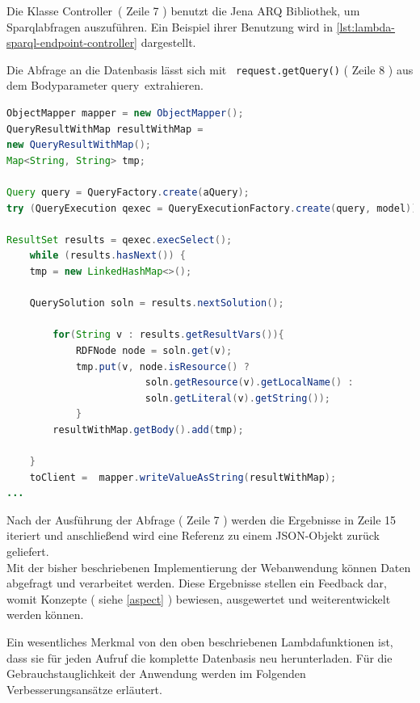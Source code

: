 \documentclass[
12pt,
english,
ngerman,
headsepline,
twoside,
openright,
numbers=noenddot,version=first
]{scrreprt}
\begin{document}
Die Klasse \glqq Controller\grqq\ ( Zeile 7 ) benutzt die Jena ARQ Bibliothek, um Sparqlabfragen auszuführen. Ein Beispiel ihrer Benutzung wird in \autoref{lst:lambda-sparql-endpoint-controller} dargestellt. 

Die Abfrage an die Datenbasis lässt sich mit \lstinline| request.getQuery()| ( Zeile 8 ) aus dem Bodyparameter \glqq query\grqq\ extrahieren.

\begin{lstlisting}[language=Java,caption={Lambda Sparql-Endpoint-Controller},label={lst:lambda-sparql-endpoint-controller}]
ObjectMapper mapper = new ObjectMapper();
QueryResultWithMap resultWithMap =
new QueryResultWithMap();
Map<String, String> tmp;

Query query = QueryFactory.create(aQuery);
try (QueryExecution qexec = QueryExecutionFactory.create(query, model)) {

ResultSet results = qexec.execSelect();
	while (results.hasNext()) {
	tmp = new LinkedHashMap<>();

	QuerySolution soln = results.nextSolution();

		for(String v : results.getResultVars()){
			RDFNode node = soln.get(v);
			tmp.put(v, node.isResource() ?
						soln.getResource(v).getLocalName() :
						soln.getLiteral(v).getString());
			}
		resultWithMap.getBody().add(tmp);

	}
	toClient =  mapper.writeValueAsString(resultWithMap);
...
\end{lstlisting}

Nach der Ausführung der Abfrage ( Zeile 7 ) werden die Ergebnisse in Zeile 15 iteriert und anschließend wird eine Referenz zu einem \acrshort{JSON}-Objekt zurück geliefert.\\

Mit der bisher beschriebenen Implementierung der Webanwendung können Daten abgefragt und verarbeitet werden. Diese Ergebnisse stellen ein Feedback dar, womit Konzepte (  siehe \autoref{aspect} ) bewiesen, ausgewertet und weiterentwickelt werden können. %


Ein wesentliches Merkmal von den oben beschriebenen Lambdafunktionen ist, dass sie für jeden Aufruf die komplette Datenbasis neu herunterladen. Für die Gebrauchstauglichkeit der Anwendung werden im Folgenden Verbesserungsansätze erläutert.
\end{document}
